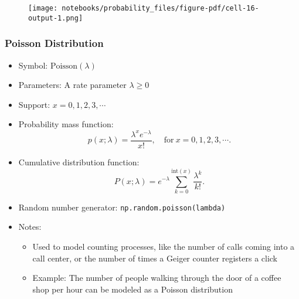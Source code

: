 \documentclass[
  letterpaper,
  DIV=11,
  numbers=noendperiod]{scrreprt}
\newenvironment{Shaded}{\begin{snugshade}}{\end{snugshade}}
\newcommand{\DecValTok}[1]{\textcolor[rgb]{0.68,0.00,0.00}{#1}}
\newcommand{\NormalTok}[1]{\textcolor[rgb]{0.00,0.23,0.31}{#1}}
\newcommand{\OperatorTok}[1]{\textcolor[rgb]{0.37,0.37,0.37}{#1}}
\newcommand{\SpecialCharTok}[1]{\textcolor[rgb]{0.37,0.37,0.37}{#1}}
\newcommand{\SpecialStringTok}[1]{\textcolor[rgb]{0.13,0.47,0.30}{#1}}
\newcommand{\StringTok}[1]{\textcolor[rgb]{0.13,0.47,0.30}{#1}}
\newcommand{\VariableTok}[1]{\textcolor[rgb]{0.07,0.07,0.07}{#1}}
\providecommand{\tightlist}{%
  \setlength{\itemsep}{0pt}\setlength{\parskip}{0pt}}\usepackage{longtable,booktabs,array}
\begin{document}
\begin{figure}[H]

{\centering \texttt{[image: notebooks/probability\_files/figure-pdf/cell-16-output-1.png]}

}

\end{figure}

\hypertarget{poisson-distribution}{%
\subsubsection{Poisson Distribution}\label{poisson-distribution}}

\begin{itemize}
\tightlist
\item
  Symbol: \(\text{Poisson}(\lambda)\)
\item
  Parameters: A rate parameter \(\lambda \geq 0\)
\item
  Support: \(x = 0, 1, 2, 3, \cdots\)
\item
  Probability mass function:
  \[p(x; \lambda) = \frac{\lambda^x e^{-\lambda}}{x!}, \quad \text{for} \ x=0,1,2,3,\cdots.\]
\item
  Cumulative distribution function:
  \[P(x; \lambda) = e^{-\lambda}\sum_{k=0}^{\text{int}(x)}\frac{\lambda^k}{k!}.\]
\item
  Random number generator: \texttt{np.random.poisson(lambda)}
\item
  Notes:

  \begin{itemize}
  \tightlist
  \item
    Used to model counting processes, like the number of calls coming
    into a call center, or the number of times a Geiger counter
    registers a click
  \item
    Example: The number of people walking through the door of a coffee
    shop per hour can be modeled as a Poisson distribution
  \end{itemize}
\end{itemize}

\begin{Shaded}
\end{Shaded}
\end{document}
